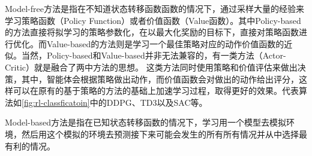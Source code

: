 Model-free方法是指在不知道状态转移函数函数的情况下，通过采样大量的经验来学习策略函数（Policy Function）或者价值函数（Value函数）。其中Policy-based的方法直接将拟学习的策略参数化，在以最大化奖励的目标下，直接对策略函数进行优化。而Value-based的方法则是学习一个最佳策略对应的动作价值函数的近似。当然，Policy-based和Value-based并非无法兼容的，有一类方法（Actor-Critic）就是融合了两中方法的思想。
这类方法同时使用策略和价值评估来做出决策，其中，智能体会根据策略做出动作，而价值函数会对做出的动作给出评分，这样可以在原有的基于策略的方法的基础上加速学习过程，取得更好的效果。代表算法如\autoref{fig:rl-classficatoin}中的DDPG\cite{lillicrap2015continuous}、TD3\cite{fujimoto2018addressing}以及SAC\cite{haarnoja2018soft}等。

Model-based方法是指在已知状态转移函数的情况下，学习用一个模型去模拟环境，然后用这个模拟的环境去预测接下来可能会发生的所有所有情况并从中选择最有利的情况。



